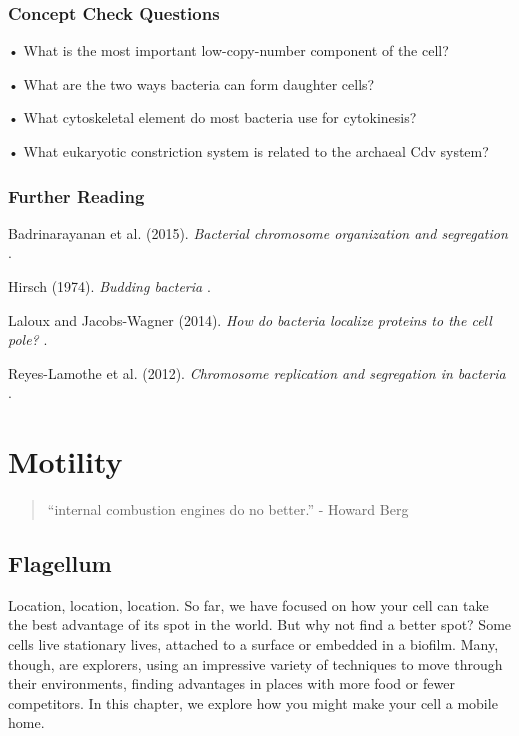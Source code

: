 \documentclass[]{tufte-book}
\begin{document}
\hypertarget{concept-check-questions-3}{%
\subsection*{Concept Check Questions}\label{concept-check-questions-3}}

• What is the most important low-copy-number component of the cell?

• What are the two ways bacteria can form daughter cells?

• What cytoskeletal element do most bacteria use for cytokinesis?

• What eukaryotic constriction system is related to the archaeal Cdv system?

\hypertarget{further-reading-4}{%
\subsection*{Further Reading}\label{further-reading-4}}

Badrinarayanan et al. (2015). \emph{Bacterial chromosome organization and segregation} \citep{badrinarayanan2015}.

Hirsch (1974). \emph{Budding bacteria} \citep{hirsch1974}.

Laloux and Jacobs-Wagner (2014). \emph{How do bacteria localize proteins to the cell pole?} \citep{laloux2014}.

Reyes-Lamothe et al. (2012). \emph{Chromosome replication and segregation in bacteria} \citep{reyes-lamothe2012}.

\hypertarget{motility}{%
\chapter{Motility}\label{motility}}

\begin{quote}
``internal combustion engines do no better.''
- Howard Berg \citep{berg1988}
\end{quote}

\hypertarget{flagellum}{%
\section{Flagellum}\label{flagellum}}

Location, location, location. So far, we have focused on how your cell can take the best advantage of its spot in the world. But why not find a better spot? Some cells live stationary lives, attached to a surface or embedded in a biofilm. Many, though, are explorers, using an impressive variety of techniques to move through their environments, finding advantages in places with more food or fewer competitors. In this chapter, we explore how you might make your cell a mobile home.
\end{document}
